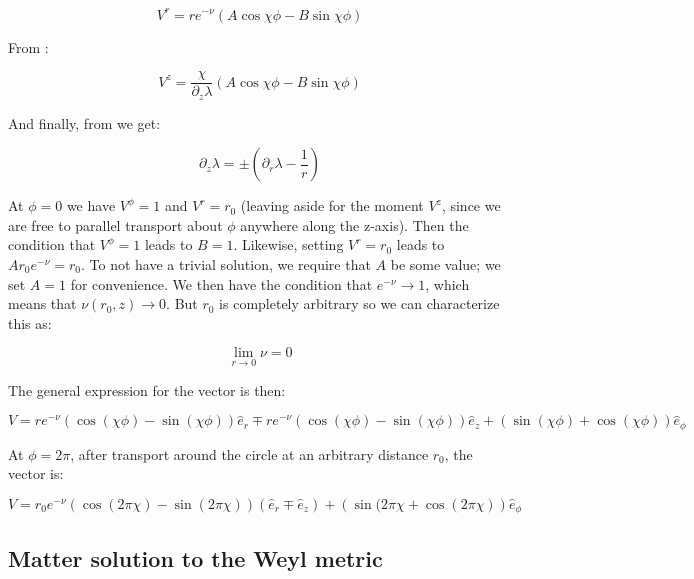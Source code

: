 \documentclass{article}
\begin{document}
\begin{equation}
V^{r}=re^{-\nu}\left(A\cos\chi\phi-B\sin\chi\phi\right)
\end{equation}

From :

\begin{equation}
V^{z}=\frac{\chi}{\partial_{z}\lambda}\left(A\cos\chi\phi-B\sin\chi\phi\right)
\end{equation}

And finally, from  we get:

\begin{equation}
  \label{eq:partial_z-partial_r}
  \partial_z\lambda = \pm\left(\partial_r\lambda-\frac{1}{r}\right)
\end{equation}

At $\phi=0$ we have $V^\phi=1$ and $V^r=r_0$ (leaving aside for the
moment $V^z$, since we are free to parallel transport about $\phi$
anywhere along the z-axis). Then the condition that $V^\phi=1$ leads to
$B=1$. Likewise, setting $V^r=r_0$ leads to $Ar_0e^{-\nu}=r_0$. To not
have a trivial solution, we require that $A$ be some value; we set
$A=1$ for convenience. We then have the condition that
$e^{-\nu}\rightarrow 1$, which means that $\nu(r_0,z)\rightarrow
0$. But $r_0$ is completely arbitrary so we can characterize this as:

\begin{equation}
  \label{eq:nu-elem-flat}
  \lim_{r\rightarrow 0}\nu=0
\end{equation}

The general expression for the vector is then:

\begin{equation}
\label{eq:v-par-transport}
V=re^{-\nu}\left(\cos(\chi\phi)-\sin(\chi\phi)\right)\hat{e}_{r}\mp re^{-\nu}\left(\cos(\chi\phi)-\sin(\chi\phi)\right)\hat{e}_{z}+\left(\sin(\chi\phi)+\cos(\chi\phi)\right)\hat{e}_{\phi}
\end{equation}

At $\phi=2\pi$, after transport around the circle at an arbitrary
distance $r_0$, the vector is:

\begin{equation}
  \label{eq:v-par-transport-2pi}
  V=r_0 e^{-\nu}\left(\cos(2\pi\chi)-\sin(2\pi\chi)\right)\left(\hat{e}_{r}\mp\hat{e}_{z}\right)+\left(\sin(2\pi\chi+\cos(2\pi\chi)\right)\hat{e}_{\phi}
\end{equation}


\subsection{Matter solution to the Weyl metric}
\end{document}
